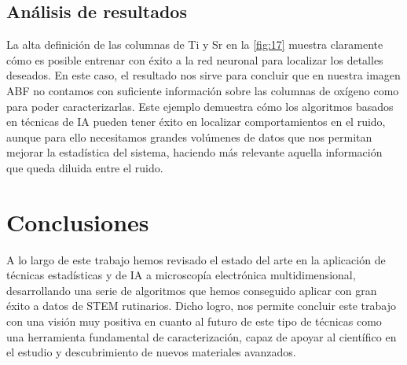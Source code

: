 \subsection{Análisis de resultados}

La alta definición de las columnas de Ti y Sr en la \autoref{fig:17} muestra claramente cómo es posible entrenar con éxito a la red neuronal para localizar los detalles deseados. En este caso, el resultado nos sirve para concluir que en nuestra imagen ABF no contamos con suficiente información sobre las columnas de oxígeno como para poder caracterizarlas. Este ejemplo demuestra cómo los algoritmos basados en técnicas de IA pueden tener éxito en localizar comportamientos en el ruido, aunque para ello necesitamos grandes volúmenes de datos que nos permitan mejorar la estadística del sistema, haciendo más relevante aquella información que queda diluida entre el ruido.

 \normalsize
\section*{Conclusiones}

A lo largo de este trabajo hemos revisado el estado del arte en la aplicación de técnicas estadísticas y de IA a microscopía electrónica multidimensional, desarrollando una serie de algoritmos que hemos conseguido aplicar con gran éxito a datos de STEM rutinarios. Dicho logro, nos permite concluir este trabajo con una visión muy positiva en cuanto al futuro de este tipo de técnicas como una herramienta fundamental de caracterización, capaz de apoyar al científico en el estudio y descubrimiento de nuevos materiales avanzados.